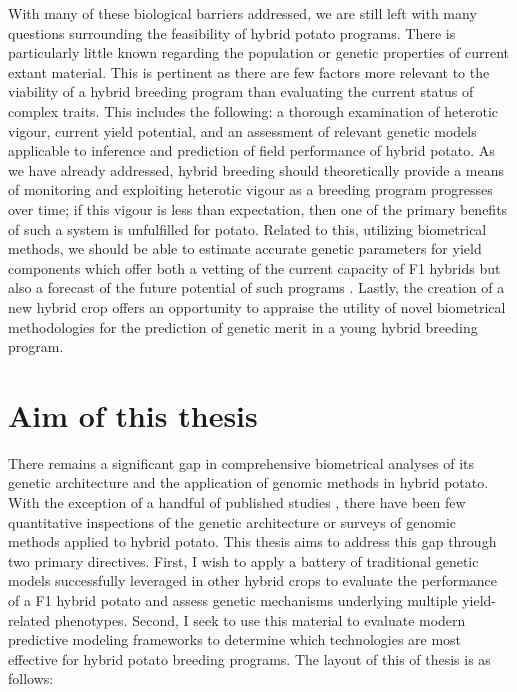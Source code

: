 \begin{refsection}
With many of these biological barriers addressed, we are still left with
many questions surrounding the feasibility of hybrid potato programs.
There is particularly little known regarding the population or genetic
properties of current extant material. This is pertinent as there are
few factors more relevant to the viability of a hybrid breeding program
than evaluating the current status of complex traits. This includes the
following: a thorough examination of heterotic vigour, current yield
potential, and an assessment of relevant genetic models applicable to
inference and prediction of field performance of hybrid potato. As we
have already addressed, hybrid breeding should theoretically provide a
means of monitoring and exploiting heterotic vigour as a breeding
program progresses over time; if this vigour is less than expectation,
then one of the primary benefits of such a system is unfulfilled for
potato. Related to this, utilizing biometrical methods, we should be
able to estimate accurate genetic parameters for yield components which
offer both a vetting of the current capacity of F1 hybrids but also a
forecast of the future potential of such programs
\parencite{Villanueva1993}. Lastly, the creation of a new hybrid crop
offers an opportunity to appraise the utility of novel biometrical methodologies for the prediction of genetic merit in a young
hybrid breeding program.

\section{Aim of this thesis}\label{aim-of-this-thesis}

There remains a significant gap in comprehensive biometrical analyses of
its genetic architecture and the application of genomic methods in
hybrid potato. With the exception of a handful of published studies
\parencite{Jansky2018,Lindhout2011,Endelman2018}, there have been few
quantitative inspections of the genetic architecture or surveys of
genomic methods applied to hybrid potato. This thesis aims to address
this gap through two primary directives. First, I wish to apply a
battery of traditional genetic models successfully leveraged in other
hybrid crops to evaluate the performance of a F1 hybrid potato and
assess genetic mechanisms underlying multiple yield-related phenotypes.
Second, I seek to use this material to evaluate modern predictive
modeling frameworks to determine which technologies are most effective
for hybrid potato breeding programs. The layout of this of thesis is as
follows:


\end{refsection}
